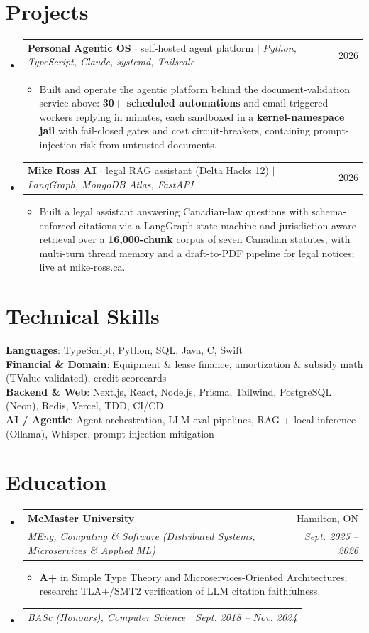 \documentclass[letterpaper,11pt]{article}
\makeatletter
\newcommand{\resumeItem}[1]{
  \item\small{
    {#1 \vspace{-2pt}}
  }
}
\newcommand{\resumeSubheading}[4]{
  \vspace{-2pt}\item
    \begin{tabular*}{0.97\textwidth}[t]{l@{\extracolsep{\fill}}r}
      \textbf{#1} & #2 \\
      \textit{\small#3} & \textit{\small #4} \\
    \end{tabular*}\vspace{-7pt}
}
\newcommand{\resumeSubSubheading}[2]{
    \item
    \begin{tabular*}{0.97\textwidth}{l@{\extracolsep{\fill}}r}
      \textit{\small#1} & \textit{\small #2} \\
    \end{tabular*}\vspace{-7pt}
}
\newcommand{\resumeProjectHeading}[2]{
    \item
    \begin{tabular*}{0.97\textwidth}{l@{\extracolsep{\fill}}r}
      \small#1 & #2 \\
    \end{tabular*}\vspace{-7pt}
}
\newcommand{\resumeSubHeadingListStart}{\begin{itemize}[leftmargin=0.15in, label={}]}
\newcommand{\resumeSubHeadingListEnd}{\end{itemize}}
\newcommand{\resumeItemListStart}{\begin{itemize}}
\newcommand{\resumeItemListEnd}{\end{itemize}\vspace{-5pt}}
\makeatother
\begin{document}
\section{Projects}
    \resumeSubHeadingListStart
      \resumeProjectHeading
          {\href{https://www.suleyman.io/architecture}{\underline{\textbf{Personal Agentic OS}}} $\cdot$ self-hosted agent platform $|$ \emph{Python, TypeScript, Claude, systemd, Tailscale}}{2026}
          \resumeItemListStart
            \resumeItem{Built and operate the agentic platform behind the document-validation service above: \textbf{30+ scheduled automations} and email-triggered workers replying in minutes, each sandboxed in a \textbf{kernel-namespace jail} with fail-closed gates and cost circuit-breakers, containing prompt-injection risk from untrusted documents.}
          \resumeItemListEnd
      \resumeProjectHeading
          {\href{https://mike-ross.ca/}{\underline{\textbf{Mike Ross AI}}} $\cdot$ legal RAG assistant (Delta Hacks 12) $|$ \emph{LangGraph, MongoDB Atlas, FastAPI}}{2026}
          \resumeItemListStart
            \resumeItem{Built a legal assistant answering Canadian-law questions with schema-enforced citations via a LangGraph state machine and jurisdiction-aware retrieval over a \textbf{16,000-chunk} corpus of seven Canadian statutes, with multi-turn thread memory and a draft-to-PDF pipeline for legal notices; live at mike-ross.ca.}
          \resumeItemListEnd
    \resumeSubHeadingListEnd

\section{Technical Skills}
\begin{itemize}[leftmargin=0.15in, label={}]
    \small{\item{
     \textbf{Languages}{: TypeScript, Python, SQL, Java, C, Swift} \\
     \textbf{Financial \& Domain}{: Equipment \& lease finance, amortization \& subsidy math (TValue-validated), credit scorecards} \\
     \textbf{Backend \& Web}{: Next.js, React, Node.js, Prisma, Tailwind, PostgreSQL (Neon), Redis, Vercel, TDD, CI/CD} \\
     \textbf{AI / Agentic}{: Agent orchestration, LLM eval pipelines, RAG + local inference (Ollama), Whisper, prompt-injection mitigation}
    }}
\end{itemize}

\section{Education}
  \resumeSubHeadingListStart
    \resumeSubheading
      {McMaster University}{Hamilton, ON}
      {MEng, Computing \& Software (Distributed Systems, Microservices \& Applied ML)}{Sept. 2025 -- 2026}
      \resumeItemListStart
        \resumeItem{\textbf{A+} in Simple Type Theory and Microservices-Oriented Architectures; research: TLA+/SMT2 verification of LLM citation faithfulness.}
      \resumeItemListEnd
    \resumeSubSubheading
      {BASc (Honours), Computer Science}{Sept. 2018 -- Nov. 2024}
  \resumeSubHeadingListEnd
\end{document}
